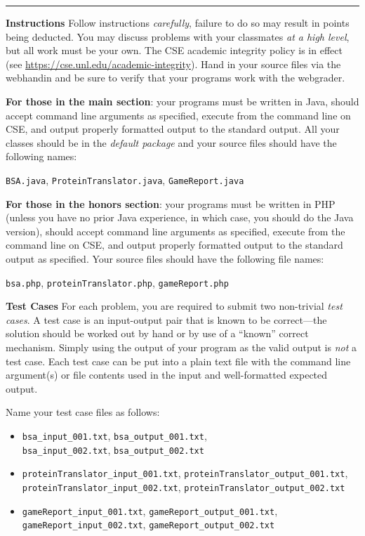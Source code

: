 \documentclass[12pt]{exam}
\begin{document}
\hrule

\textbf{Instructions}
Follow instructions \emph{carefully}, failure to do so may result in
points being deducted.  You may discuss problems with your classmates
\emph{at a high level}, but all work must be your own. The CSE academic 
integrity policy is in effect (see \url{https://cse.unl.edu/academic-integrity}).
Hand in your source files via the webhandin and be sure to verify that 
your programs work with the webgrader.  

\textbf{For those in the main section}: your programs must be
written in Java, should accept command line arguments as specified, 
execute from the command line on CSE, and output properly formatted 
output to the standard output.  All your classes should be in the
\emph{default package} and your source files should have the 
following names: 

\texttt{BSA.java}, \texttt{ProteinTranslator.java}, \texttt{GameReport.java}

\textbf{For those in the honors section}: your programs must be written 
in PHP (unless you have no prior Java experience, in which case, you should
do the Java version), should accept command line arguments as specified, 
execute from the command line on CSE, and output properly formatted output to the 
standard output as specified.  Your source files should have the following 
file names: 

\texttt{bsa.php}, \texttt{proteinTranslator.php}, \texttt{gameReport.php}

\textbf{Test Cases} For each problem, you are required to submit 
two non-trivial \emph{test cases}.  A test case is an input-output 
pair that is known to be correct---the solution should be worked out 
by hand or by use of a ``known'' correct mechanism.  Simply using 
the output of your program as the valid output is \emph{not} a test 
case.  Each test case can be put into a plain text file with the 
command line argument(s) or file contents used in the input and 
well-formatted expected output.  

Name your test case files as follows:

\begin{itemize}
  \item \texttt{bsa_input_001.txt}, 
        \texttt{bsa_output_001.txt},\\
        \texttt{bsa_input_002.txt},
        \texttt{bsa_output_002.txt}
  \item \texttt{proteinTranslator_input_001.txt}, 
        \texttt{proteinTranslator_output_001.txt},\\
        \texttt{proteinTranslator_input_002.txt},
        \texttt{proteinTranslator_output_002.txt}
  \item \texttt{gameReport_input_001.txt},
        \texttt{gameReport_output_001.txt},\\
        \texttt{gameReport_input_002.txt},
        \texttt{gameReport_output_002.txt}
\end{itemize}
\end{document}
